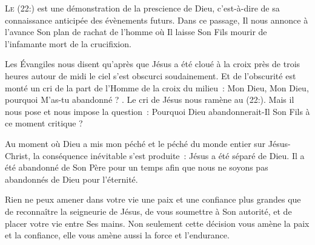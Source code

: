 


\lettrine{L}{e (22:)} est une démonstration
 de la prescience de Dieu, c'est-à-dire de sa connaissance anticipée
 des évènements futurs.
 Dans ce passage, Il nous annonce à l'avance Son plan de rachat
 de l'homme où Il laisse Son Fils mourir de l'infamante mort de la crucifixion.

Les Évangiles nous disent qu'après que Jésus a
 été cloué à la croix
 près de trois heures \ocadr{}autour de midi\fcadr{} le ciel s'est obscurci soudainement.
 Et de l'obscurité est monté un cri de la part de l'Homme de la croix du milieu~:
 \Og Mon Dieu, Mon Dieu, pourquoi M'as-tu abandonné ? \Fg{}.
 Le cri de Jésus nous ramène au (22:).
 Mais il nous pose et nous impose la question~:
 Pourquoi Dieu abandonnerait-Il Son Fils à ce moment critique ?


Au moment où Dieu a mis mon péché \ocadr{}et le péché du monde entier\fcadr{}
 sur Jésus-Christ, la conséquence inévitable s'est produite~:
 Jésus a été séparé de Dieu. Il a été abandonné de Son Père
 pour un temps afin que nous ne soyons pas abandonnés de Dieu pour l'éternité.

Rien ne peux amener dans votre vie une paix et une confiance plus grandes
 que de reconnaître la seigneurie 
 de Jésus, de vous soumettre à Son autorité,
 et de placer votre vie entre Ses mains.
 Non seulement cette décision vous amène la paix et la confiance,
 elle vous amène aussi la force et l'endurance.

\dvrule





